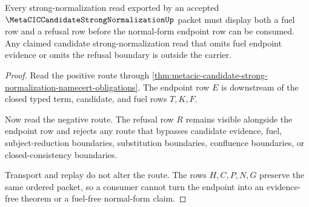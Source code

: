 \begin{theorem}
\label{thm:metacic-candidate-strong-normalization-endpoint-refusal}
Every strong-normalization read exported by an accepted $\MetaCICCandidateStrongNormalizationUp$ packet must display both a fuel row and a refusal row before the normal-form endpoint row can be consumed. Any claimed candidate strong-normalization read that omits fuel endpoint evidence or omits the refusal boundary is outside the carrier.
\end{theorem}
\begin{proof}
Read the positive route through \autoref{thm:metacic-candidate-strong-normalization-namecert-obligations}. The endpoint row $E$ is downstream of the closed typed term, candidate, and fuel rows $T,K,F$.

Now read the negative route. The refusal row $R$ remains visible alongside the endpoint row and rejects any route that bypasses candidate evidence, fuel, subject-reduction boundaries, substitution boundaries, confluence boundaries, or closed-consistency boundaries.

Transport and replay do not alter the route. The rows $H,C,P,N,G$ preserve the same ordered packet, so a consumer cannot turn the endpoint into an evidence-free theorem or a fuel-free normal-form claim.
\end{proof}

